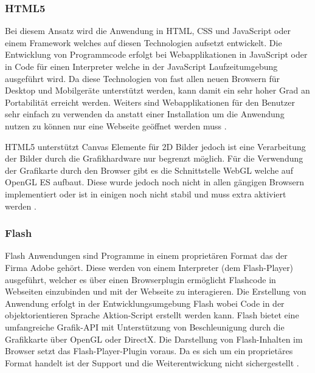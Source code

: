 \subsubsection{HTML5}
\label{sec:HTML5}
Bei diesem Ansatz wird die Anwendung in HTML, CSS und JavaScript oder einem Framework welches auf diesen Technologien aufsetzt entwickelt.
Die Entwicklung von Programmcode erfolgt bei Webapplikationen in JavaScript oder in Code für einen Interpreter welche in der JavaScript Laufzeitumgebung ausgeführt wird.
Da diese Technologien von fast allen neuen Browsern für Desktop und Mobilgeräte unterstützt werden, kann damit ein sehr hoher Grad an Portabilität erreicht werden.
Weiters sind Webapplikationen für den Benutzer sehr einfach zu verwenden da anstatt einer Installation um die Anwendung nutzen zu können nur eine Webseite geöffnet werden muss \cite{html}.

HTML5 \cite{html} unterstützt Canvas Elemente für 2D Bilder jedoch ist eine Verarbeitung der Bilder durch die Grafikhardware nur begrenzt möglich.
Für die Verwendung der Grafikarte durch den Browser gibt es die Schnittstelle WebGL \cite{webgl-14} welche auf OpenGL ES \cite{opengl-es-sepc} aufbaut.
Diese wurde jedoch noch nicht in allen gängigen Browsern implementiert oder ist in einigen noch nicht stabil und muss extra aktiviert werden \cite{webgl-14}.


\subsubsection{Flash}
\label{sec:Flash}
Flash Anwendungen sind Programme in einem proprietären Format das der Firma Adobe gehört.
Diese werden von einem Interpreter (dem Flash-Player) ausgeführt, welcher es über einen Browserplugin ermöglicht Flashcode in Webseiten einzubinden und mit der Webseite zu interagieren.
%
Die Erstellung von Anwendung erfolgt in der Entwicklungsumgebung Flash wobei Code in der objektorientieren Sprache Aktion-Script erstellt werden kann.
Flash bietet eine umfangreiche Grafik-API mit Unterstützung von Beschleunigung durch die Grafikkarte über OpenGL oder DirectX.
%
Die Darstellung von Flash-Inhalten im Browser setzt das Flash-Player-Plugin voraus.
Da es sich um ein proprietäres Format handelt ist der Support und die Weiterentwickung nicht sichergestellt \cite{flash-14}.
